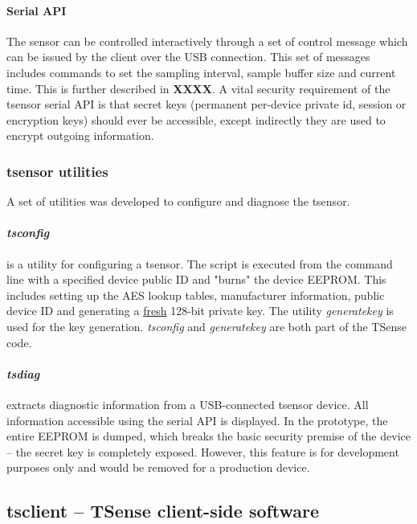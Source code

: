 \paragraph{Serial API}

The sensor can be controlled interactively through a set of control message which can be issued by the client over the USB connection. This set of messages includes commands to set the sampling interval, sample buffer size and current time. This is further described in \textbf{XXXX}. A vital security requirement of the tsensor serial API is that secret keys (permanent per-device private id, session or encryption keys) should ever be accessible, except indirectly they are used to encrypt outgoing information.

\subsubsection{tsensor utilities}

A set of utilities was developed to configure and diagnose the tsensor.

\paragraph{\textit{tsconfig}} is a utility for configuring a tsensor. The script is executed from the command line with a specified device public ID and "burns" the device EEPROM. This includes setting up the AES lookup tables, manufacturer information, public device ID and generating a \underline{fresh} 128-bit private key. The utility \textit{generatekey} is used for the key generation. \textit{tsconfig} and \textit{generatekey} are both part of the TSense code.

\paragraph{\textit{tsdiag}} extracts diagnostic information from a USB-connected tsensor device. All information accessible using the serial API is displayed. In the prototype, the entire EEPROM is dumped, which breaks the basic security premise of the device -- the secret key is completely exposed. However, this feature is for development purposes only and would be removed for a production device.

\subsection{tsclient -- TSense client-side software}

